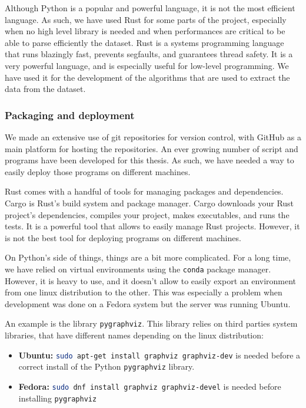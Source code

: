     Although Python is a popular and powerful language, it is not the most efficient language. As such, we have used Rust for some parts of the project, especially when no high level library is needed and when performances are critical to be able to parse efficiently the dataset. Rust is a systems programming language that runs blazingly fast, prevents segfaults, and guarantees thread safety. It is a very powerful language, and is especially useful for low-level programming. We have used it for the development of the algorithms that are used to extract the data from the dataset.

    \subsubsection{Packaging and deployment}
    We made an extensive use of git repositories for version control, with GitHub as a main platform for hosting the repositories. An ever growing number of script and programs have been developed for this thesis. As such, we have needed a way to easily deploy those programs on different machines.

    Rust comes with a handful of tools for managing packages and dependencies. Cargo is Rust's build system and package manager. Cargo downloads your Rust project's dependencies, compiles your project, makes executables, and runs the tests. It is a powerful tool that allows to easily manage Rust projects. However, it is not the best tool for deploying programs on different machines. 

    On Python's side of things, things are a bit more complicated. For a long time, we have relied on virtual environments using the \texttt{conda} package manager. However, it is heavy to use, and it doesn't allow to easily export an environment from one linux distribution to the other. This was especially a problem when development was done on a Fedora system but the server was running Ubuntu. 

    An example is the library \texttt{pygraphviz}. This library relies on third parties system libraries, that have different names depending on the linux distribution:
    
    \begin{itemize}
        \item \textbf{Ubuntu:} \lstinline[language=bash]|sudo apt-get install graphviz graphviz-dev| is needed before a correct install of the Python \texttt{pygraphviz} library. 
        \item \textbf{Fedora:} \lstinline[language=bash]|sudo dnf install graphviz graphviz-devel| is needed before installing \texttt{pygraphviz}
    \end{itemize}

